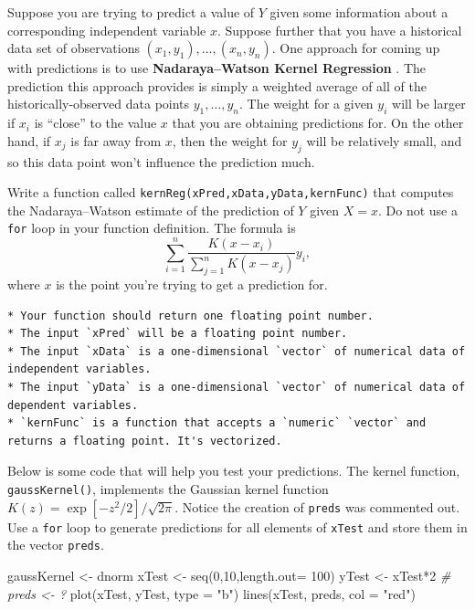 \documentclass[
  12pt,
  krantz2]{krantz}
\makeatletter
\newenvironment{Shaded}{\begin{snugshade}}{\end{snugshade}}
\newcommand{\AttributeTok}[1]{\textcolor[rgb]{0.61,0.61,0.61}{#1}}
\newcommand{\CommentTok}[1]{\textcolor[rgb]{0.37,0.37,0.37}{\textit{#1}}}
\newcommand{\DecValTok}[1]{\textcolor[rgb]{0.06,0.06,0.06}{#1}}
\newcommand{\FunctionTok}[1]{\textcolor[rgb]{0,0,0}{#1}}
\newcommand{\NormalTok}[1]{#1}
\newcommand{\OtherTok}[1]{\textcolor[rgb]{0.37,0.37,0.37}{#1}}
\newcommand{\SpecialCharTok}[1]{\textcolor[rgb]{0,0,0}{#1}}
\newcommand{\StringTok}[1]{\textcolor[rgb]{0.5,0.5,0.5}{#1}}
\newenvironment{kframe}{%
\medskip{}
\setlength{\fboxsep}{.8em}
 \def\at@end@of@kframe{}%
 \ifinner\ifhmode%
  \def\at@end@of@kframe{\end{minipage}}%
  \begin{minipage}{\columnwidth}%
 \fi\fi%
 \def\FrameCommand##1{\hskip\@totalleftmargin \hskip-\fboxsep
 \colorbox{shadecolor}{##1}\hskip-\fboxsep
     \hskip-\linewidth \hskip-\@totalleftmargin \hskip\columnwidth}%
 \MakeFramed {\advance\hsize-\width
   \@totalleftmargin\z@ \linewidth\hsize
   \@setminipage}}%
 {\par\unskip\endMakeFramed%
 \at@end@of@kframe}
\renewenvironment{Shaded}{\begin{kframe}}{\end{kframe}}
\makeatother
\begin{document}
Suppose you are trying to predict a value of \(Y\) given some information about a corresponding independent variable \(x\). Suppose further that you have a historical data set of observations \((x_1, y_1), \ldots, (x_n,y_n)\). One approach for coming up with predictions is to use \textbf{Nadaraya--Watson Kernel Regression} \citep{Nadaraya} \citep{Watson}. The prediction this approach provides is simply a weighted average of all of the historically-observed data points \(y_1, \ldots, y_n\). The weight for a given \(y_i\) will be larger if \(x_i\) is ``close'' to the value \(x\) that you are obtaining predictions for. On the other hand, if \(x_j\) is far away from \(x\), then the weight for \(y_j\) will be relatively small, and so this data point won't influence the prediction much.

Write a function called \texttt{kernReg(xPred,xData,yData,kernFunc)} that computes the Nadaraya--Watson estimate of the prediction of \(Y\) given \(X=x\). Do not use a \texttt{for} loop in your function definition. The formula is
\[\sum_{i=1}^n \frac{K(x-x_i)}{\sum_{j=1}^n K(x-x_j) } y_i,\] where \(x\) is the point you're trying to get a prediction for.

\begin{verbatim}
* Your function should return one floating point number. 
* The input `xPred` will be a floating point number.
* The input `xData` is a one-dimensional `vector` of numerical data of independent variables. 
* The input `yData` is a one-dimensional `vector` of numerical data of dependent variables.
* `kernFunc` is a function that accepts a `numeric` `vector` and returns a floating point. It's vectorized.
\end{verbatim}

Below is some code that will help you test your predictions. The kernel function, \texttt{gaussKernel()}, implements the Gaussian kernel function \(K(z) = \exp[-z^2/2]/\sqrt{2\pi}\). Notice the creation of \texttt{preds} was commented out. Use a \texttt{for} loop to generate predictions for all elements of \texttt{xTest} and store them in the vector \texttt{preds}.

\begin{Shaded}
\begin{Highlighting}[]
\NormalTok{gaussKernel }\OtherTok{\textless{}{-}}\NormalTok{ dnorm}
\NormalTok{xTest }\OtherTok{\textless{}{-}} \FunctionTok{seq}\NormalTok{(}\DecValTok{0}\NormalTok{,}\DecValTok{10}\NormalTok{,}\AttributeTok{length.out=} \DecValTok{100}\NormalTok{)}
\NormalTok{yTest }\OtherTok{\textless{}{-}}\NormalTok{ xTest}\SpecialCharTok{*}\DecValTok{2} 
\CommentTok{\# preds \textless{}{-} ?}
\FunctionTok{plot}\NormalTok{(xTest, yTest, }\AttributeTok{type =} \StringTok{"b"}\NormalTok{)}
\FunctionTok{lines}\NormalTok{(xTest, preds, }\AttributeTok{col =} \StringTok{"red"}\NormalTok{)}
\end{Highlighting}
\end{Shaded}
\end{document}
